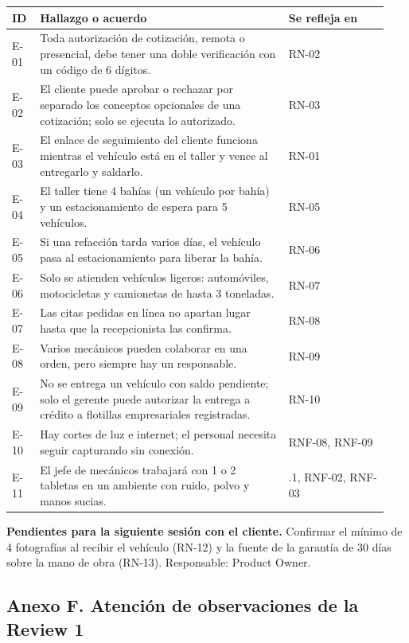 {\small
\begin{longtable}[]{@{}
  >{\raggedright\arraybackslash}p{0.07\linewidth}
  >{\raggedright\arraybackslash}p{0.62\linewidth}
  >{\raggedright\arraybackslash}p{0.25\linewidth}@{}}
\toprule
\textbf{ID} & \textbf{Hallazgo o acuerdo} & \textbf{Se refleja en} \\
\midrule
\endhead
\bottomrule
\endlastfoot
E-01 & Toda autorización de cotización, remota o presencial, debe tener
una doble verificación con un código de 6 dígitos. & RN-02 \\
E-02 & El cliente puede aprobar o rechazar por separado los conceptos
opcionales de una cotización; solo se ejecuta lo autorizado. & RN-03 \\
E-03 & El enlace de seguimiento del cliente funciona mientras el vehículo
está en el taller y vence al entregarlo y saldarlo. & RN-01 \\
E-04 & El taller tiene 4 bahías (un vehículo por bahía) y un
estacionamiento de espera para 5 vehículos. & RN-05 \\
E-05 & Si una refacción tarda varios días, el vehículo pasa al
estacionamiento para liberar la bahía. & RN-06 \\
E-06 & Solo se atienden vehículos ligeros: automóviles, motocicletas y
camionetas de hasta 3 toneladas. & RN-07 \\
E-07 & Las citas pedidas en línea no apartan lugar hasta que la
recepcionista las confirma. & RN-08 \\
E-08 & Varios mecánicos pueden colaborar en una orden, pero siempre hay
un responsable. & RN-09 \\
E-09 & No se entrega un vehículo con saldo pendiente; solo el gerente
puede autorizar la entrega a crédito a flotillas empresariales
registradas. & RN-10 \\
E-10 & Hay cortes de luz e internet; el personal necesita seguir
capturando sin conexión. & RNF-08, RNF-09 \\
E-11 & El jefe de mecánicos trabajará con 1 o 2 tabletas en un ambiente
con ruido, polvo y manos sucias. & 4.3.1, RNF-02, RNF-03 \\
\end{longtable}
}

\textbf{Pendientes para la siguiente sesión con el cliente.} Confirmar el
mínimo de 4 fotografías al recibir el vehículo (RN-12) y la fuente de la
garantía de 30 días sobre la mano de obra (RN-13). Responsable: Product
Owner.

\subsection{Anexo F. Atención de observaciones de la Review 1}\label{anexo-f}


